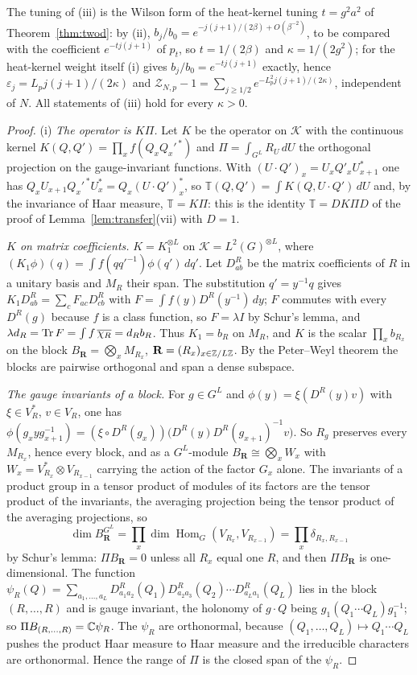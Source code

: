 The tuning of (iii) is the Wilson form of the heat-kernel tuning $t=g^2a^2$
of Theorem~\ref{thm:twod}: by (ii), $b_j/b_0=e^{-j(j+1)/(2\beta)+O(\beta^{-2})}$,
to be compared with the coefficient $e^{-tj(j+1)}$ of $p_t$, so $t=1/(2\beta)$
and $\kappa=1/(2g^2)$; for the heat-kernel weight itself (i) gives $b_j/b_0=
e^{-tj(j+1)}$ exactly, hence $\varepsilon_j=L_pj(j+1)/(2\kappa)$ and
$\mathcal Z_{N,p}-1=\sum_{j\ge1/2}e^{-L_p^2j(j+1)/(2\kappa)}$, independent of
$N$. All statements of (iii) hold for every $\kappa>0$.

\begin{proof}
(i) \emph{The operator is $K\Pi$.} Let $K$ be the operator on $\mathcal K$ with
the continuous kernel $K(Q,Q')=\prod_xf(Q_xQ_x'^{\,*})$ and $\Pi=\int_{G^L}
R_U\,dU$ the orthogonal projection on the gauge-invariant functions. With
$(U\cdot Q')_x=U_xQ'_xU_{x+1}^*$ one has $Q_xU_{x+1}Q_x'^{\,*}U_x^*=
Q_x(U\cdot Q')_x^*$, so $\mathbb T(Q,Q')=\int K(Q,U\cdot Q')\,dU$ and, by the
invariance of Haar measure, $\mathbb T=K\Pi$: this is the identity $\mathbb T=
DK\Pi D$ of the proof of Lemma~\ref{lem:transfer}(vii) with $D=1$.

\emph{$K$ on matrix coefficients.} $K=K_1^{\otimes L}$ on $\mathcal K=
L^2(G)^{\otimes L}$, where $(K_1\phi)(q)=\int f(qq'^{-1})\phi(q')\,dq'$. Let
$D^R_{ab}$ be the matrix coefficients of $R$ in a unitary basis and $M_R$
their span. The substitution $q'=y^{-1}q$ gives $K_1D^R_{ab}=\sum_c F_{ac}
D^R_{cb}$ with $F=\int f(y)D^R(y^{-1})\,dy$; $F$ commutes with every $D^R(g)$
because $f$ is a class function, so $F=\lambda I$ by Schur's lemma, and
$\lambda d_R=\operatorname{Tr} F=\int f\,\overline{\chi_R}=d_Rb_R$. Thus $K_1=b_R$ on $M_R$,
and $K$ is the scalar $\prod_xb_{R_x}$ on the block $B_{\mathbf R}=
\bigotimes_xM_{R_x}$, $\mathbf R=(R_x)_{x\in\mathbb{Z}/L\mathbb{Z}}$. By the Peter--Weyl
theorem the blocks are pairwise orthogonal and span a dense subspace.

\emph{The gauge invariants of a block.} For $g\in G^L$ and $\phi(y)=
\xi(D^R(y)v)$ with $\xi\in V_R^*$, $v\in V_R$, one has $\phi(g_xyg_{x+1}^{-1})
=(\xi\circ D^R(g_x))\bigl(D^R(y)D^R(g_{x+1})^{-1}v\bigr)$. So $R_g$ preserves
every $M_{R_x}$, hence every block, and as a $G^L$-module $B_{\mathbf R}\cong
\bigotimes_xW_x$ with $W_x=V_{R_x}^*\otimes V_{R_{x-1}}$ carrying the action of
the factor $G_x$ alone. The invariants of a product group in a tensor product
of modules of its factors are the tensor product of the invariants, the
averaging projection being the tensor product of the averaging projections, so
\[
\dim B_{\mathbf R}^{G^L}=\prod_x\dim\operatorname{Hom}_G(V_{R_x},V_{R_{x-1}})
=\prod_x\delta_{R_x,R_{x-1}}
\]
by Schur's lemma: $\Pi B_{\mathbf R}=0$ unless all $R_x$ equal one $R$, and
then $\Pi B_{\mathbf R}$ is one-dimensional. The function $\psi_R(Q)=
\sum_{a_1,\dots,a_L}D^R_{a_1a_2}(Q_1)D^R_{a_2a_3}(Q_2)\cdots D^R_{a_La_1}(Q_L)$
lies in the block $(R,\dots,R)$ and is gauge invariant, the holonomy of
$g\cdot Q$ being $g_1(Q_1\cdots Q_L)g_1^{-1}$; so $\Pi B_{(R,\dots,R)}=
\mathbb{C}\psi_R$. The $\psi_R$ are orthonormal, because $(Q_1,\dots,Q_L)\mapsto
Q_1\cdots Q_L$ pushes the product Haar measure to Haar measure and the
irreducible characters are orthonormal. Hence the range of $\Pi$ is the
closed span of the $\psi_R$.


\end{proof}
